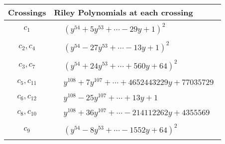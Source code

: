 \documentclass[1p]{elsarticle_modified}
\theoremstyle{definition}
\begin{document}
\begin{tabular}{m{50pt}|m{274pt}}
Crossings & \hspace{64pt}Riley Polynomials at each crossing \\
\hline $$\begin{aligned}c_{1}\end{aligned}$$&$\begin{aligned}
&(y^{54}+5 y^{53}+\cdots-29 y+1)^{2}
\end{aligned}$\\
\hline $$\begin{aligned}c_{2},c_{4}\end{aligned}$$&$\begin{aligned}
&(y^{54}-27 y^{53}+\cdots-13 y+1)^{2}
\end{aligned}$\\
\hline $$\begin{aligned}c_{3},c_{7}\end{aligned}$$&$\begin{aligned}
&(y^{54}+24 y^{53}+\cdots+560 y+64)^{2}
\end{aligned}$\\
\hline $$\begin{aligned}c_{5},c_{11}\end{aligned}$$&$\begin{aligned}
&y^{108}+7 y^{107}+\cdots+4652443229 y+77035729
\end{aligned}$\\
\hline $$\begin{aligned}c_{6},c_{12}\end{aligned}$$&$\begin{aligned}
&y^{108}-25 y^{107}+\cdots+13 y+1
\end{aligned}$\\
\hline $$\begin{aligned}c_{8},c_{10}\end{aligned}$$&$\begin{aligned}
&y^{108}+36 y^{107}+\cdots-214112262 y+4355569
\end{aligned}$\\
\hline $$\begin{aligned}c_{9}\end{aligned}$$&$\begin{aligned}
&(y^{54}-8 y^{53}+\cdots-1552 y+64)^{2}
\end{aligned}$\\
\hline
\end{tabular}\\~\\
\end{document}
